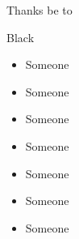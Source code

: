 \documentclass{MichiganTech}
\begin{document}
%
\begin{frame}[t]{Thanks be to}
  \vspace*{0.10in}
  \begin{reference}{8mm}{75mm}{Black}
    \;
  \end{reference}

  \begin{itemize}[<+->]
    \item Someone
    \item Someone
    \item Someone
    \item Someone
    \item Someone
    \item Someone
    \item Someone
  \end{itemize}
\end{frame}


%
\finalslide

%
\end{document}
